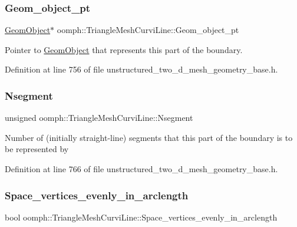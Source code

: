 \subsubsection{\texorpdfstring{Geom\+\_\+object\+\_\+pt}{Geom\_object\_pt}}
{\footnotesize\ttfamily \hyperlink{classoomph_1_1GeomObject}{Geom\+Object}$\ast$ oomph\+::\+Triangle\+Mesh\+Curvi\+Line\+::\+Geom\+\_\+object\+\_\+pt\hspace{0.3cm}{\ttfamily [private]}}



Pointer to \hyperlink{classoomph_1_1GeomObject}{Geom\+Object} that represents this part of the boundary. 



Definition at line 756 of file unstructured\+\_\+two\+\_\+d\+\_\+mesh\+\_\+geometry\+\_\+base.\+h.

\mbox{\label{classoomph_1_1TriangleMeshCurviLine_ad623f3774469ffacddb79862263ad70d}} 
\subsubsection{\texorpdfstring{Nsegment}{Nsegment}}
{\footnotesize\ttfamily unsigned oomph\+::\+Triangle\+Mesh\+Curvi\+Line\+::\+Nsegment\hspace{0.3cm}{\ttfamily [private]}}

Number of (initially straight-\/line) segments that this part of the boundary is to be represented by 

Definition at line 766 of file unstructured\+\_\+two\+\_\+d\+\_\+mesh\+\_\+geometry\+\_\+base.\+h.

\mbox{\label{classoomph_1_1TriangleMeshCurviLine_a36ad5bcb2bc7abac6f91084c1f715118}} 
\subsubsection{\texorpdfstring{Space\+\_\+vertices\+\_\+evenly\+\_\+in\+\_\+arclength}{Space\_vertices\_evenly\_in\_arclength}}
{\footnotesize\ttfamily bool oomph\+::\+Triangle\+Mesh\+Curvi\+Line\+::\+Space\+\_\+vertices\+\_\+evenly\+\_\+in\+\_\+arclength\hspace{0.3cm}{\ttfamily [private]}}



